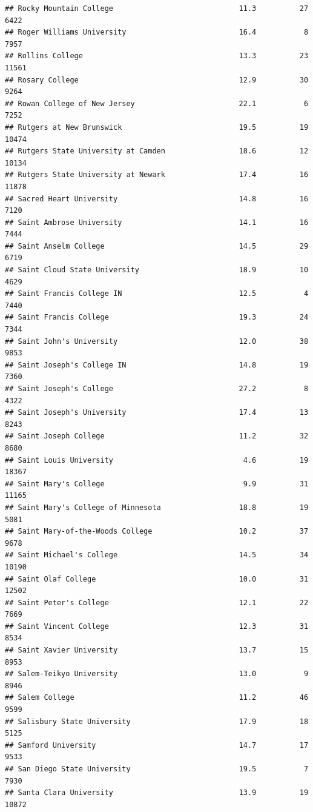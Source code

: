 \documentclass[
]{article}
\begin{document}
\begin{verbatim}
## Rocky Mountain College                             11.3          27   6422
## Roger Williams University                          16.4           8   7957
## Rollins College                                    13.3          23  11561
## Rosary College                                     12.9          30   9264
## Rowan College of New Jersey                        22.1           6   7252
## Rutgers at New Brunswick                           19.5          19  10474
## Rutgers State University at Camden                 18.6          12  10134
## Rutgers State University at Newark                 17.4          16  11878
## Sacred Heart University                            14.8          16   7120
## Saint Ambrose University                           14.1          16   7444
## Saint Anselm College                               14.5          29   6719
## Saint Cloud State University                       18.9          10   4629
## Saint Francis College IN                           12.5           4   7440
## Saint Francis College                              19.3          24   7344
## Saint John's University                            12.0          38   9853
## Saint Joseph's College IN                          14.8          19   7360
## Saint Joseph's College                             27.2           8   4322
## Saint Joseph's University                          17.4          13   8243
## Saint Joseph College                               11.2          32   8680
## Saint Louis University                              4.6          19  18367
## Saint Mary's College                                9.9          31  11165
## Saint Mary's College of Minnesota                  18.8          19   5081
## Saint Mary-of-the-Woods College                    10.2          37   9678
## Saint Michael's College                            14.5          34  10190
## Saint Olaf College                                 10.0          31  12502
## Saint Peter's College                              12.1          22   7669
## Saint Vincent College                              12.3          31   8534
## Saint Xavier University                            13.7          15   8953
## Salem-Teikyo University                            13.0           9   8946
## Salem College                                      11.2          46   9599
## Salisbury State University                         17.9          18   5125
## Samford University                                 14.7          17   9533
## San Diego State University                         19.5           7   7930
## Santa Clara University                             13.9          19  10872

\end{verbatim}
\end{document}
